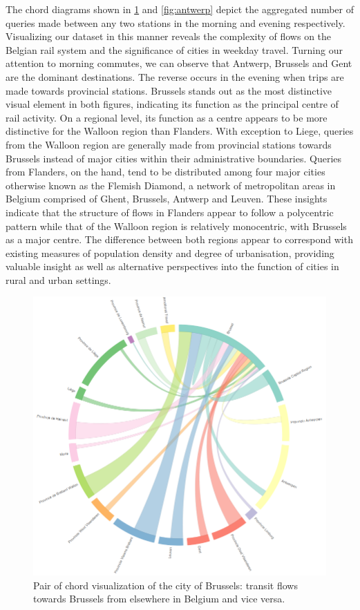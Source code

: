 \documentclass{sig-alternate}
\begin{document}
The chord diagrams shown in \cref{fig:brussels} and \cref{fig:antwerp} depict the aggregated number of queries made between any two stations in the morning and evening respectively. 
Visualizing our dataset in this manner reveals the complexity of flows on the Belgian rail system and the significance of cities in weekday travel.
Turning our attention to morning commutes, we can observe that Antwerp, Brussels and Gent are the dominant destinations.
The reverse occurs in the evening when trips are made towards provincial stations.
Brussels stands out as the most distinctive visual element in both figures, indicating its function as the principal centre of rail activity.
On a regional level, its function as a centre appears to be more distinctive for the Walloon region than Flanders.
With exception to Liege, queries from the Walloon region are generally made from provincial stations towards Brussels instead of major cities within their administrative boundaries. 
Queries from Flanders, on the hand, tend to be distributed among four major cities otherwise known as the Flemish Diamond, a network of metropolitan areas in Belgium comprised of Ghent, Brussels, Antwerp and Leuven. 
These insights indicate that the structure of flows in Flanders appear to follow a polycentric pattern while that of the Walloon region is relatively monocentric, with   Brussels as a major centre.
The difference between both regions appear to correspond with existing measures of population density and degree of urbanisation, providing valuable insight as well as alternative perspectives into the function of cities in rural and urban settings.

\begin{figure}
\centering
\includegraphics[width=15cm]{brussels}
\caption{Pair of chord visualization of the city of Brussels: transit flows towards Brussels from elsewhere in Belgium and vice versa.}
\label{fig:brussels}
\end{figure}
\end{document}
